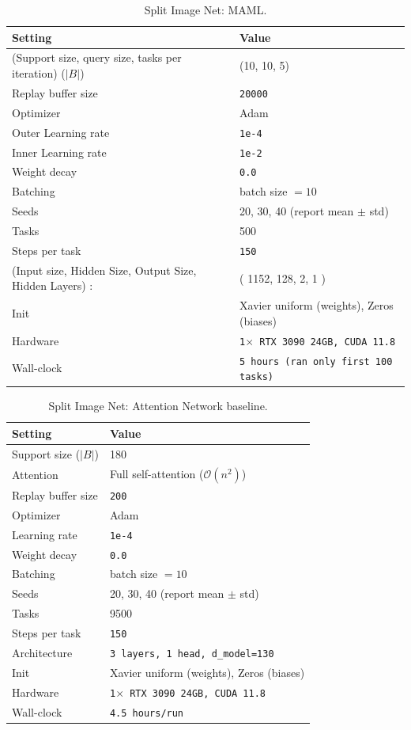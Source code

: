 \documentclass{article}
\begin{document}
\begin{table}[H]
\centering
\footnotesize
\caption{Split Image Net: MAML.}
\label{tab:split_image_net_maml}
\begin{tabular}{@{}ll@{}}
\toprule
Setting & Value \\ \midrule
(Support size, query size, tasks per iteration) ($|B|$) & (10, 10, 5) \\
Replay buffer size & \texttt{20000} \\
Optimizer & Adam \\
Outer Learning rate & \texttt{1e-4} \\
Inner Learning rate & \texttt{1e-2} \\
Weight decay & \texttt{0.0} \\
Batching & batch size $=10$ \\
Seeds & 20, 30, 40 (report mean $\pm$ std) \\
Tasks & 500 \\
Steps per task & \texttt{150} \\
(Input size, Hidden Size, Output Size, Hidden Layers) : & ( 1152, 128, 2, 1 ) \\ 
Init & Xavier uniform (weights), Zeros (biases) \\
Hardware & \texttt{1$\times$ RTX 3090 24GB, CUDA 11.8} \\
Wall-clock & \texttt{5 hours (ran only first 100 tasks)} \\
\bottomrule
\end{tabular}
\end{table}


\begin{table}[H]
\centering
\footnotesize
\caption{Split Image Net: Attention Network baseline.}
\label{tab:split_image_net_attention}
\begin{tabular}{@{}ll@{}}
\toprule
Setting & Value \\ \midrule
Support size ($|B|$) & 180 \\
Attention & Full self-attention ($\mathcal{O}(n^2)$) \\
Replay buffer size & \texttt{200} \\
Optimizer & Adam \\
Learning rate & \texttt{1e-4} \\
Weight decay & \texttt{0.0} \\
Batching & batch size $=10$ \\
Seeds & 20, 30, 40 (report mean $\pm$ std) \\
Tasks & 9500 \\
Steps per task & \texttt{150} \\
Architecture & \texttt{3 layers, 1 head, d\_model=130} \\
Init & Xavier uniform (weights), Zeros (biases) \\
Hardware & \texttt{1$\times$ RTX 3090 24GB, CUDA 11.8} \\
Wall-clock & \texttt{4.5 hours/run} \\
\bottomrule
\end{tabular}
\end{table}
\end{document}
